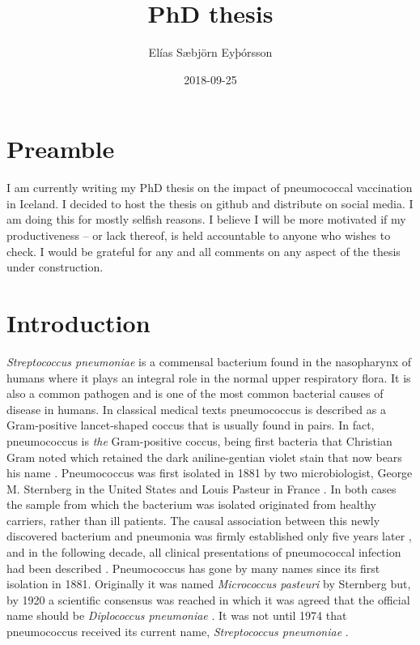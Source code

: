 \documentclass[]{book}
\title{PhD thesis}
\author{Elías Sæbjörn Eyþórsson}
\date{2018-09-25}
\theoremstyle{definition}
\theoremstyle{definition}
\theoremstyle{definition}
\theoremstyle{remark}
\begin{document}
\maketitle

{
\setcounter{tocdepth}{1}
\tableofcontents
}
\chapter{Preamble}\label{preamble}

I am currently writing my PhD thesis on the impact of pneumococcal
vaccination in Iceland. I decided to host the thesis on github and
distribute on social media. I am doing this for mostly selfish reasons.
I believe I will be more motivated if my productiveness -- or lack
thereof, is held accountable to anyone who wishes to check. I would be
grateful for any and all comments on any aspect of the thesis under
construction.

\chapter{Introduction}\label{intro}

\emph{Streptococcus pneumoniae} is a commensal bacterium found in the
nasopharynx of humans where it plays an integral role in the normal
upper respiratory flora. It is also a common pathogen and is one of the
most common bacterial causes of disease in humans. In classical medical
texts pneumococcus is described as a Gram-positive lancet-shaped coccus
that is usually found in pairs. In fact, pneumococcus is \emph{the}
Gram-positive coccus, being first bacteria that Christian Gram noted
which retained the dark aniline-gentian violet stain that now bears his
name \citep{Gram1884}. Pneumococcus was first isolated in 1881 by two
microbiologist, George M. Sternberg in the United States and Louis
Pasteur in France \citep{Pasteur1881, Sternberg1881, Watson1993}. In
both cases the sample from which the bacterium was isolated originated
from healthy carriers, rather than ill patients. The causal association
between this newly discovered bacterium and pneumonia was firmly
established only five years later \citep{Weichselbaum1886}, and in the
following decade, all clinical presentations of pneumococcal infection
had been described \citep{Austrian1981}. Pneumococcus has gone by many
names since its first isolation in 1881. Originally it was named
\emph{Micrococcus pasteuri} by Sternberg \citep{Sternberg1881} but, by
1920 a scientific consensus was reached in which it was agreed that the
official name should be \emph{Diplococcus pneumoniae}
\citep{Winslow1920}. It was not until 1974 that pneumococcus received
its current name, \emph{Streptococcus pneumoniae} \citep{Deibel1974}.
\end{document}
